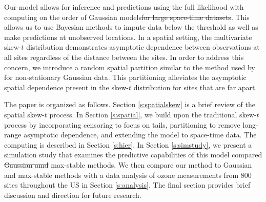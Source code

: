 \documentclass[useAMS,usenatbib,referee]{biom}
\providecommand{\DIFadd}[1]{{\protect\color{blue}\uwave{#1}}} %
\providecommand{\DIFdel}[1]{{\protect\color{red}\sout{#1}}}                      %
\providecommand{\DIFaddbegin}{} %
\providecommand{\DIFaddend}{} %
\providecommand{\DIFdelbegin}{} %
\providecommand{\DIFdelend}{} %
\begin{document}
Our model allows for inference and predictions using the full likelihood with computing on the order of Gaussian models\DIFdelbegin \DIFdel{for large space-time datasets}\DIFdelend .
This allows us to use Bayesian methods to impute data below the threshold as well as \DIFaddbegin \DIFadd{to }\DIFaddend make predictions at unobserved locations.
In a spatial setting, the multivariate skew-$t$ distribution demonstrates asymptotic dependence between observations at all sites regardless of the distance between the sites.
In order to address this concern, we introduce a random spatial partition similar to the method used by \citet{Kim2005} for non-stationary Gaussian data.
This partitioning alleviates the asymptotic spatial dependence present in the skew-$t$ distribution for sites that are far apart.

The paper is organized as follows.
Section \ref{s:spatialskew} is a brief review of the spatial skew-$t$ process.
In Section \ref{s:spatial}, we build upon the traditional skew-$t$ process by incorporating censoring to focus on tails, partitioning to remove long-range asymptotic dependence, and extending the model to space-time data.
The computing is described in Section \ref{s:hier}.
In Section \ref{s:simstudy}, we present a simulation study that examines the predictive capabilities of this model compared \DIFdelbegin \DIFdel{Gaussian amd }\DIFdelend \DIFaddbegin \DIFadd{to Gaussian and }\DIFaddend max-stable methods.
We then compare our method to Gaussian and max-stable methods with a data analysis of ozone measurements from 800 sites throughout the US in Section \ref{s:analysis}.
The final section provides brief discussion and direction for future research.


\end{document}
